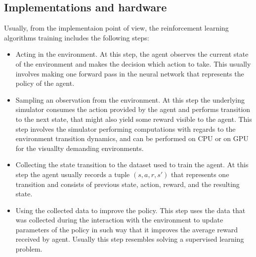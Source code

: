 \subsection{Implementations and hardware}




Usually, from the implementaion point of view, the reinforcement learning algorithms training
includes the following steps:
\begin{itemize}
    \item Acting in the environment. At this step, the agent observes the current state of the
    environment and makes the decision which action to take. This usually involves making one
    forward pass in the neural network that represents the policy of the agent.

    \item Sampling an observation from the environment. At this step the underlying simulator consumes
    the action provided by the agent and performs transition to the next state, that might also
    yield some reward visible to the agent. This step involves the simulator performing computations
    with regards to the environment transition dynamics, and can be performed on CPU or on GPU for
    the visuallty demanding environments.

    \item Collecting the state transition to the dataset used to train the agent. At this step
    the agent usually records a tuple $(s, a, r, s')$ that represents one transition and
    consists of previous state, action, reward, and the resulting state.

    \item Using the collected data to improve the policy. This step uses the data that was collected
    during the interaction with the environment to update parameters of the policy in such way that
    it improves the average reward received by agent. Usually this step resembles solving a
    supervised learning problem.
\end{itemize}

